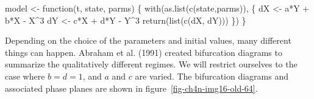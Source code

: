 \documentclass[
  a4paper,
  DIV=11,
  numbers=noendperiod,
  oneside]{scrreprt}
\newenvironment{Shaded}{}{}
\newcommand{\ControlFlowTok}[1]{\textcolor[rgb]{0.84,0.23,0.29}{#1}}
\newcommand{\DecValTok}[1]{\textcolor[rgb]{0.00,0.36,0.77}{#1}}
\newcommand{\FunctionTok}[1]{\textcolor[rgb]{0.44,0.26,0.76}{#1}}
\newcommand{\NormalTok}[1]{\textcolor[rgb]{0.14,0.16,0.18}{#1}}
\newcommand{\OtherTok}[1]{\textcolor[rgb]{0.44,0.26,0.76}{#1}}
\newcommand{\SpecialCharTok}[1]{\textcolor[rgb]{0.00,0.36,0.77}{#1}}
\begin{document}
\begin{Shaded}
\begin{Highlighting}[]
\NormalTok{model }\OtherTok{\textless{}{-}} \ControlFlowTok{function}\NormalTok{(t, state, parms) \{}
  \FunctionTok{with}\NormalTok{(}\FunctionTok{as.list}\NormalTok{(}\FunctionTok{c}\NormalTok{(state,parms)), \{}
\NormalTok{    dX }\OtherTok{\textless{}{-}}\NormalTok{ a}\SpecialCharTok{*}\NormalTok{Y }\SpecialCharTok{+}\NormalTok{ b}\SpecialCharTok{*}\NormalTok{X }\SpecialCharTok{{-}}\NormalTok{ X}\SpecialCharTok{\^{}}\DecValTok{3} 
\NormalTok{    dY }\OtherTok{\textless{}{-}}\NormalTok{ c}\SpecialCharTok{*}\NormalTok{X }\SpecialCharTok{+}\NormalTok{ d}\SpecialCharTok{*}\NormalTok{Y }\SpecialCharTok{{-}}\NormalTok{ Y}\SpecialCharTok{\^{}}\DecValTok{3}
    \FunctionTok{return}\NormalTok{(}\FunctionTok{list}\NormalTok{(}\FunctionTok{c}\NormalTok{(dX, dY))) }
\NormalTok{  \})}
\NormalTok{\}}
\end{Highlighting}
\end{Shaded}

Depending on the choice of the parameters and initial values, many
different things can happen. Abraham et al. (1991) created bifurcation
diagrams to summarize the qualitatively different regimes. We will
restrict ourselves to the case where \(b = d = 1\), and \(a\) and \(c\)
are varied. The bifurcation diagrams and associated phase planes are
shown in figure~\ref{fig-ch4n-img16-old-64}.
\end{document}
